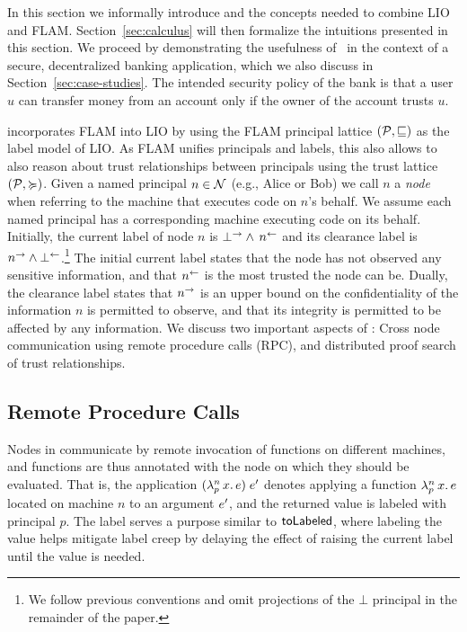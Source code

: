 In this section we informally introduce \lang{} and the concepts needed to combine LIO and FLAM. Section~\ref{sec:calculus} will then formalize the intuitions presented in this section. We proceed by demonstrating the usefulness of \lang{}\ in the context of a secure, decentralized banking application, which we also discuss in Section~\ref{sec:case-studies}. The intended security policy of the bank is that a user $u$ can transfer money from an account only if the owner of the account trusts $u$.

\lang{} incorporates FLAM into LIO by using the FLAM principal lattice $(\mathcal{P}, \sqsubseteq)$ as the label model of LIO. As FLAM unifies principals and labels, this also allows \lang{} to also reason about trust relationships between principals using the trust lattice $(\mathcal{P}, \succcurlyeq)$.
Given a named principal $n \in \mathcal{N}$ (e.g., Alice or Bob) we call $n$ a \emph{node} when referring to the machine that executes code on $n$'s behalf. We assume each named principal has a corresponding machine executing code on its behalf. Initially, the current label of node $n$ is $\bot^{\rightarrow} \wedge\, n^{\leftarrow}$ and its clearance label is $n^{\rightarrow} \wedge \bot^{\leftarrow}$.\footnote{We follow previous conventions \cite{Arden:2015:FA:2859845.2859998} and omit projections of the $\bot$ principal in the remainder of the paper.} The initial current label states that the node has not observed any sensitive information, and that $n^{\leftarrow}$ is the most trusted the node can be. Dually, the clearance label states that $n^{\rightarrow}$ is an upper bound on the confidentiality of the information $n$ is permitted to observe, and that its integrity is permitted to be affected by any information. We discuss two important aspects of \lang: Cross node communication using remote procedure calls (RPC), and distributed proof search of trust relationships.

\subsection{Remote Procedure Calls}
Nodes in \lang{} communicate by remote invocation of functions on different machines, and functions are thus annotated with the node on which they should be evaluated. That is, the application $(\lambda^{n}_{p}\,x.\,e)\;e'$ denotes applying a function $\lambda^{n}_{p}\,x.\,e$ located on machine $n$ to an argument $e'$, and the returned value is labeled with principal $p$. The label serves a purpose similar to $\mathsf{toLabeled}$, where labeling the value helps mitigate label creep by delaying the effect of raising the current label until the value is needed.

